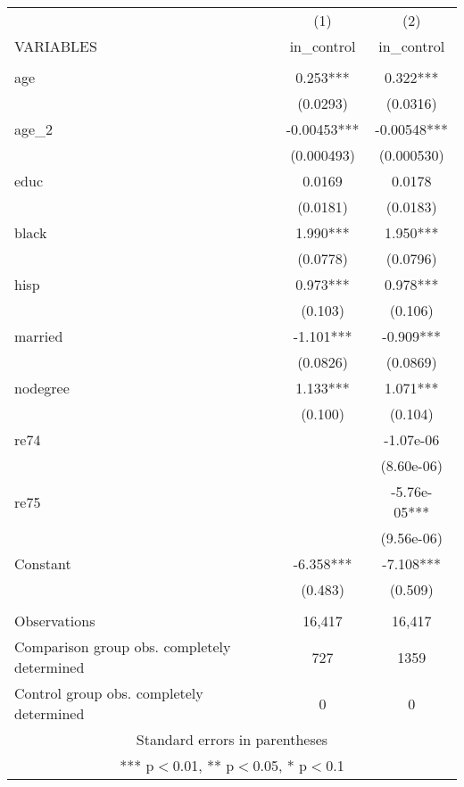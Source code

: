 \begin{tabular}{lcc} \hline
 & (1) & (2) \\
VARIABLES & in\_control & in\_control \\ \hline
 &  &  \\
age & 0.253*** & 0.322*** \\
 & (0.0293) & (0.0316) \\
age\_2 & -0.00453*** & -0.00548*** \\
 & (0.000493) & (0.000530) \\
educ & 0.0169 & 0.0178 \\
 & (0.0181) & (0.0183) \\
black & 1.990*** & 1.950*** \\
 & (0.0778) & (0.0796) \\
hisp & 0.973*** & 0.978*** \\
 & (0.103) & (0.106) \\
married & -1.101*** & -0.909*** \\
 & (0.0826) & (0.0869) \\
nodegree & 1.133*** & 1.071*** \\
 & (0.100) & (0.104) \\
re74 &  & -1.07e-06 \\
 &  & (8.60e-06) \\
re75 &  & -5.76e-05*** \\
 &  & (9.56e-06) \\
Constant & -6.358*** & -7.108*** \\
 & (0.483) & (0.509) \\
 &  &  \\
Observations & 16,417 & 16,417 \\
Comparison group obs. completely determined & 727 & 1359 \\
 Control group obs. completely determined & 0 & 0 \\ \hline
\multicolumn{3}{c}{ Standard errors in parentheses} \\
\multicolumn{3}{c}{ *** p$<$0.01, ** p$<$0.05, * p$<$0.1} \\
\end{tabular}
